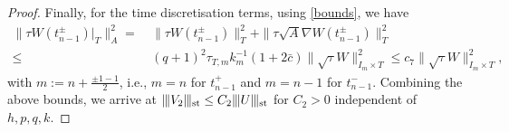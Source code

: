 \documentclass{amsart}
\newcommand{\norm}[2]{\|{#1}\|_{{#2}}}
\newcommand{\ndg}[1]{|\kern-.03cm \|{#1}|\kern-.03cm \|}
\theoremstyle{definition}
\theoremstyle{remark}
\numberwithin{equation}{section}
\begin{document}
\begin{proof}
Finally, for the time discretisation terms, using \eqref{bounds}, we have
\begin{equation*}\begin{split}
			\norm{\tau W(t_{n-1}^\pm)|_{T}}{A}^2 = &\
		\norm{\tau W(t_{n-1}^\pm)}{T}^2
		+
		\norm{\tau \sqrt{A}\nabla W(t_{n-1}^\pm)}{T}^2
		\\
			\leq&\  (q+1)^2 \tau_{T,m}k_m^{-1}
		(1
		+ 2\bar{c} ) \norm{\sqrt{\tau}W }{I_{m}\times T}^2 \le c_7 \norm{\sqrt{\tau}W }{I_{m}\times T}^2,
\end{split}\end{equation*}
with $m:=n+\frac{\pm 1-1}{2}$, i.e., $m=n$ for $t_{n-1}^+$ and $m=n-1$ for $t_{n-1}^-$. Combining the above bounds, we arrive at $\ndg{V_2 }_{\rm st}\leq C_2 \ndg{U}_{\rm st}$ for $C_2>0$ independent of $h,p,q,k$.


\end{proof}
\end{document}

